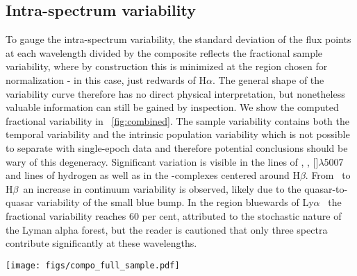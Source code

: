 \documentclass{aa}    %
\newcommand{\figref}[1]{\ref{fig:#1}}
\newcommand{\Fig}[1]{\figurename~\figref{#1}}
\newcommand{\fig}[1]{\Fig{#1}}
\newcommand{\figlabel}[1]{\label{fig:#1}}
\newcommand{\sectionname}{Sect.}
\newcommand{\Sect}[1]{\sectionname~\ref{sect:#1}}
\newcommand{\sect}[1]{\Sect{#1}}
\newcommand{\sectlabel}[1]{\label{sect:#1}}
\newcommand{\lya}{Ly$\alpha$}
\newcommand{\hb}{H$\beta$}
\newcommand{\ha}{H$\alpha$}
\newcommand{\oiii}{[\ion{O}{iii}]$\lambda$5007}
\newcommand{\feii}{\ion{Fe}{ii}}
\newcommand{\civ}{\ion{C}{iv}}
\newcommand{\mgii}{\ion{Mg}{ii}}
\begin{document}
 \subsection{Intra-spectrum variability}  \sectlabel{variability}
 
 To gauge the intra-spectrum variability, the standard deviation of the flux points at each wavelength divided by the composite reflects the fractional sample variability, where by construction this is minimized at the region chosen for normalization - in this case, just redwards of \ha. The general shape of the variability curve therefore has no direct physical interpretation, but nonetheless valuable information can still be gained by inspection. We show the computed fractional variability in \fig{combined}. The sample variability contains both the temporal variability and the intrinsic population variability which is not possible to separate with single-epoch data and therefore potential conclusions should be wary of this degeneracy.
 Significant variation is visible in the lines of \civ, \mgii, \oiii~ and lines of hydrogen as well as in the \feii-complexes centered around \hb. From \civ~to \hb~an increase in continuum variability is observed, likely due to the quasar-to-quasar variability of the small blue bump. In the region bluewards of \lya~ the fractional variability reaches 60 per cent, attributed to the stochastic nature of the Lyman alpha forest, but the reader is cautioned that only three spectra contribute significantly at these wavelengths.  
  
\begin{figure*}[t!]
\centering
\texttt{[image: figs/compo\_full\_sample.pdf]}
\caption[]{X-shooter weighted arithmetic quasar composite on a linear wavelength scale in light brown. The position of several prominent emission lines are marked. Overplotted in dark green is the corresponding composite generated from the full sample of SDSS quasars fulfilling the selection criteria and general agreement is observed, albeit with a brighter balmer continuum in the SDSS-constructed composite. In purple is shown the results from fitting both a pure and a broken power-law to the regions specified in \sect{results} and they are observed to be indistinguishable.}
\figlabel{composite}
\end{figure*}
\end{document}
